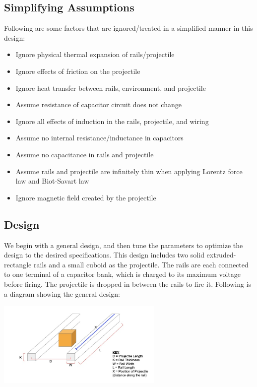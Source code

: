 \documentclass[12pt]{article}
\begin{document}
\subsection{Simplifying Assumptions}
Following are some factors that are ignored/treated in a simplified manner in this design:
\begin{itemize}
    \item Ignore physical thermal expansion of rails/projectile
    \item Ignore effects of friction on the projectile
    \item Ignore heat transfer between rails, environment, and projectile
    \item Assume resistance of capacitor circuit does not change
    \item Ignore all effects of induction in the rails, projectile, and wiring
    \item Assume no internal resistance/inductance in capacitors
    \item Assume no capacitance in rails and projectile
    \item Assume rails and projectile are infinitely thin when applying Lorentz force law and Biot-Savart law
    \item Ignore magnetic field created by the projectile 
\end{itemize}

\subsection{Design}
We begin with a general design, and then tune the parameters to optimize the design to the desired specifications. This design includes two solid extruded-rectangle rails and a small cuboid as the projectile. The rails are each connected to one terminal of a capacitor bank, which is charged to its maximum voltage before firing. The projectile is dropped in between the rails to fire it. Following is a diagram showing the general design:

\includegraphics[width=8cm]{diagram}
\end{document}
